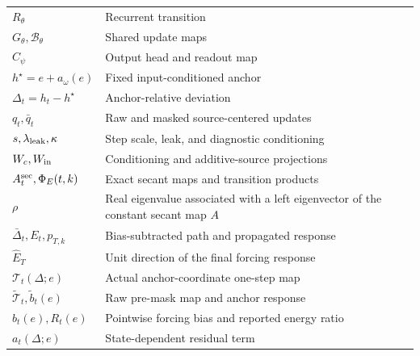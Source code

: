 \documentclass[letterpaper]{article} %
\newcommand{\Block}{\mathcal{B}}
\newcommand{\Tmap}{\mathcal{T}}
\theoremstyle{remark}
\begin{document}
\begin{table}[t!]
{\begin{tabular}{ll}
			$R_\theta$                              & Recurrent transition                                                              \\
			$G_\theta,\Block_\theta$                & Shared update maps                                                                \\
			$C_\psi$                                & Output head and readout map                                                       \\
			$h^\star=e+a_\omega(e)$                 & Fixed input-conditioned anchor                                                    \\
			$\Delta_t=h_t-h^\star$                  & Anchor-relative deviation                                                         \\
			$q_t,\bar q_t$                          & Raw and masked source-centered updates                                            \\
			$s,\lambda_{\rm leak},\kappa$           & Step scale, leak, and diagnostic conditioning                                     \\
			$W_c,W_{\rm in}$                        & Conditioning and additive-source projections                                      \\
			$A_t^{\rm sec},\Phi_E(t,k)$             & Exact secant maps and transition products                                         \\
			$\rho$                                  & Real eigenvalue associated with a left eigenvector of the constant secant map $A$ \\
			$\bar\Delta_t,E_t,p_{T,k}$              & Bias-subtracted path and propagated response                                      \\
			$\widehat E_T$                          & Unit direction of the final forcing response                                      \\
			$\Tmap_t(\Delta;e)$                     & Actual anchor-coordinate one-step map                                             \\
			$\widetilde{\Tmap}_t,\widetilde b_t(e)$ & Raw pre-mask map and anchor response                                              \\
			$b_t(e),R_t(e)$                         & Pointwise forcing bias and reported energy ratio                                  \\
			$a_t(\Delta;e)$                         & State-dependent residual term                                                     \\

\end{tabular}}
\end{table}
\end{document}
